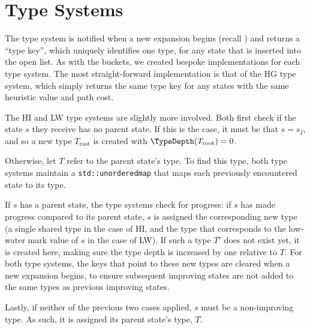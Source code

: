 \section{Type Systems}

The type system is notified when a new expansion begins (recall ) and returns a ``type key'', which uniquely identifies one type, for any state that is inserted into the open list. As with the buckets, we created bespoke implementations for each type system. The most straight-forward implementation is that of the HG type system, which simply returns the same type key for any states with the same heuristic value and path cost.

The HI and LW type systems are slightly more involved. Both first check if the state $s$ they receive has no parent state. If this is the case, it must be that $s=s_I$, and so a new type $T_\text{root}$ is created with $\TypeDepth(T_\text{root})=0$.

Otherwise, let $T$ refer to the parent state's type. To find this type, both type systems maintain a \texttt{std::unordered\textunderscore map} that maps each previously encountered state to its type.

If $s$ has a parent state, the type systems check for progress: if $s$ has made progress compared to its parent state, $s$ is assigned the corresponding new type (a single shared type in the case of HI, and the type that corresponds to the low-water mark value of $s$ in the case of LW). If such a type $T'$ does not exist yet, it is created here, making sure the type depth is increased by one relative to $T$. For both type systems, the keys that point to these new types are cleared when a new expansion begins, to ensure subsequent improving states are not added to the same types as previous improving states.

Lastly, if neither of the previous two cases applied, $s$ must be a non-improving type. As such, it is assigned its parent state's type, $T$.
